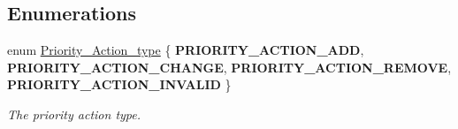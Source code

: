 \subsection*{Enumerations}
\begin{DoxyCompactItemize}
\item 
\mbox{\label{group__RTEMSScorePriority_gae6fceeae8a1c66316277dc3b52e3ba27}} 
enum \mbox{\hyperlink{group__RTEMSScorePriority_gae6fceeae8a1c66316277dc3b52e3ba27}{Priority\+\_\+\+Action\+\_\+type}} \{ {\bfseries P\+R\+I\+O\+R\+I\+T\+Y\+\_\+\+A\+C\+T\+I\+O\+N\+\_\+\+A\+DD}, 
{\bfseries P\+R\+I\+O\+R\+I\+T\+Y\+\_\+\+A\+C\+T\+I\+O\+N\+\_\+\+C\+H\+A\+N\+GE}, 
{\bfseries P\+R\+I\+O\+R\+I\+T\+Y\+\_\+\+A\+C\+T\+I\+O\+N\+\_\+\+R\+E\+M\+O\+VE}, 
{\bfseries P\+R\+I\+O\+R\+I\+T\+Y\+\_\+\+A\+C\+T\+I\+O\+N\+\_\+\+I\+N\+V\+A\+L\+ID}
 \}
\begin{DoxyCompactList}\small\item\em The priority action type. \end{DoxyCompactList}\end{DoxyCompactItemize}
